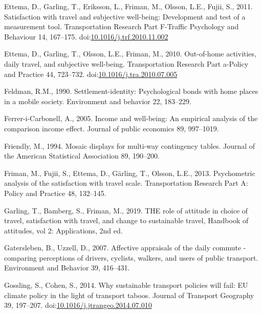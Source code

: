 \documentclass[]{elsarticle} %
\begin{document}
\leavevmode\hypertarget{ref-Ettema2011satisfaction}{}%
Ettema, D., Garling, T., Eriksson, L., Friman, M., Olsson, L.E., Fujii,
S., 2011. Satisfaction with travel and subjective well-being:
Development and test of a measurement tool. Transportation Research Part
F-Traffic Psychology and Behaviour 14, 167--175.
doi:\href{https://doi.org/10.1016/j.trf.2010.11.002}{10.1016/j.trf.2010.11.002}

\leavevmode\hypertarget{ref-Ettema2010out}{}%
Ettema, D., Garling, T., Olsson, L.E., Friman, M., 2010. Out-of-home
activities, daily travel, and subjective well-being. Transportation
Research Part a-Policy and Practice 44, 723--732.
doi:\href{https://doi.org/10.1016/j.tra.2010.07.005}{10.1016/j.tra.2010.07.005}

\leavevmode\hypertarget{ref-Feldman1990settlement}{}%
Feldman, R.M., 1990. Settlement-identity: Psychological bonds with home
places in a mobile society. Environment and behavior 22, 183--229.

\leavevmode\hypertarget{ref-Ferrer2005income}{}%
Ferrer-i-Carbonell, A., 2005. Income and well-being: An empirical
analysis of the comparison income effect. Journal of public economics
89, 997--1019.

\leavevmode\hypertarget{ref-Friendly1994mosaic}{}%
Friendly, M., 1994. Mosaic displays for multi-way contingency tables.
Journal of the American Statistical Association 89, 190--200.

\leavevmode\hypertarget{ref-Friman2013psychometric}{}%
Friman, M., Fujii, S., Ettema, D., Gärling, T., Olsson, L.E., 2013.
Psychometric analysis of the satisfaction with travel scale.
Transportation Research Part A: Policy and Practice 48, 132--145.

\leavevmode\hypertarget{ref-Garling2019role}{}%
Garling, T., Bamberg, S., Friman, M., 2019. THE role of attitude in
choice of travel, satisfaction with travel, and change to sustainable
travel, Handbook of attitudes, vol 2: Applications, 2nd ed.

\leavevmode\hypertarget{ref-Gatersleben2007affective}{}%
Gatersleben, B., Uzzell, D., 2007. Affective appraisals of the daily
commute - comparing perceptions of drivers, cyclists, walkers, and users
of public transport. Environment and Behavior 39, 416--431.

\leavevmode\hypertarget{ref-Gossling2014sustainable}{}%
Gossling, S., Cohen, S., 2014. Why sustainable transport policies will
fail: EU climate policy in the light of transport taboos. Journal of
Transport Geography 39, 197--207.
doi:\href{https://doi.org/10.1016/j.jtrangeo.2014.07.010}{10.1016/j.jtrangeo.2014.07.010}
\end{document}
